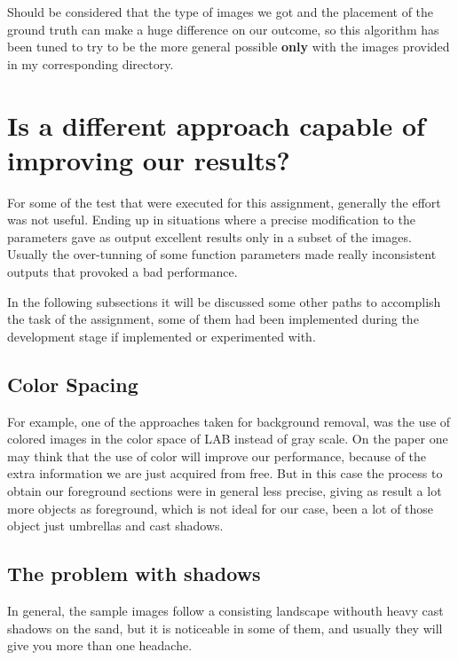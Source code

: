 \documentclass[11pt]{article}
\begin{document}
\FloatBarrier


Should be considered that the type of images we got and the placement of the ground truth can make a huge difference on our outcome, so this algorithm has been tuned to try to be the more general possible \textbf{only} with the images provided in my corresponding directory.

\section{Is a different approach capable of improving our results?}

For some of the test that were executed for this assignment, generally the effort was not useful. Ending up in situations where a precise modification to the parameters gave as output excellent results only in a subset of the images. Usually the over-tunning of some function parameters made really inconsistent outputs that provoked a bad performance.\newline

In the following subsections it will be discussed some other paths to accomplish the task of the assignment, some of them had been implemented during the development stage if implemented or experimented with.

\subsection*{Color Spacing}

For example, one of the approaches taken for background removal, was the use of colored images in the color space of LAB  instead of gray scale. On the paper one may think that the use of color will improve our performance, because of the extra information we are just acquired from free. But in this case the process to obtain our foreground sections were in general less precise, giving as result a lot more objects as foreground, which is not ideal for our case, been a lot of those object just umbrellas and cast shadows.\newline

\subsection*{The problem with shadows}

In general, the sample images follow a consisting landscape withouth heavy cast shadows on the sand, but it is noticeable in some of them, and usually they will give you more than one headache.\newline
\end{document}
